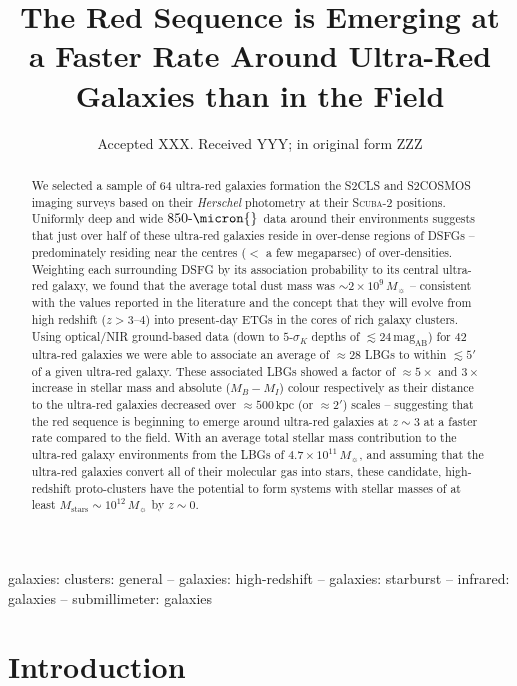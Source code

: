 \documentclass[a4paper, fleqn, usenatbib]{mnras}
\title[The Red Sequence is Emerging at a Faster Rate Around Ultra-Red Galaxies]{The Red Sequence is Emerging at a Faster Rate Around Ultra-Red Galaxies than in the Field}
\author[A.~J.~R.~Lewis et al.]{
A.~J.~R.~Lewis,
R.~J.~Ivison,$^{1,2}$
P.~N.~Best,$^{1}$
M.~Bremmer,${?}
J.~E.~Geach,$^{?}$
I.~Oteo,$^{?}$
J.~M.~Simpson,$^{?}$
A.~Weiss$^{?}$\\
$^{1}$Institute for Astronomy, University of Edinburgh, Royal Observatory, Blackford Hill, Edinburgh EH9 3HJ, UK\\
$^{2}$European Southern Observatory, Karl Schwarzchild Stra{\ss}e 2, D-85748 Garching, Germany
}
\date{Accepted XXX. Received YYY; in original form ZZZ}
\newcommand{\herschel}{\textit{Herschel}}
\newcommand{\magab}{\text{mag}_{\text{AB}}}
\newcommand{\msol}{M_{\sun}}
\newcommand{\mstars}{M_{\text{stars}}}
\newcommand{\scuba}{\mbox{\textsc{Scuba}-2}}
\newcommand{\urg}{ultra-red galaxy}
\begin{document}
\label{firstpage}
\pagerange{\pageref{firstpage}--\pageref{lastpage}}
\maketitle

\begin{abstract}
We selected a sample of $64$ ultra-red galaxies formation the S2CLS and S2COSMOS imaging surveys based on their \herschel{} photometry at their \scuba{} positions.
Uniformly deep and wide $850\text{-}\micron{}$ data around their environments suggests that just over half of these ultra-red galaxies reside in over-dense regions of DSFGs -- predominately residing near the centres ($<$ a few megaparsec) of over-densities.
Weighting each surrounding DSFG by its association probability to its central ultra-red galaxy, we found that the average total dust mass was $\sim2\times10^{9}\,\msol{}$ -- consistent with the values reported in the literature and the concept that they will evolve from high redshift ($z>3\text{--}4$) into present-day ETGs in the cores of rich galaxy clusters.
%
Using optical/NIR ground-based data (down to $5\text{-}\sigma_{K}$ depths of $\lesssim24\,\magab{}$) for $42$ ultra-red galaxies we were able to associate an average of $\approx28$ LBGs to within $\lesssim5'$ of a given \urg{}.
These associated LBGs showed a factor of $\approx5\times$ and $3\times$ increase in stellar mass and absolute ($M_{B}-M_{I}$) colour respectively as their distance to the ultra-red galaxies decreased over $\approx500\,\text{kpc}$ (or $\approx2'$) scales -- suggesting that the red sequence is beginning to emerge around ultra-red galaxies at $z\sim3$ at a faster rate compared to the field.
%
With an average total stellar mass contribution to the ultra-red galaxy environments from the LBGs of $4.7\times10^{11}\,\msol{}$, and assuming that the ultra-red galaxies convert all of their molecular gas into stars, these candidate, high-redshift proto-clusters have the potential to form systems with stellar masses of at least $\mstars{}\sim10^{12}\,\msol{}$ by $z\sim0$.
\end{abstract}

\begin{keywords}
galaxies: clusters: general -- galaxies: high-redshift -- galaxies: starburst -- infrared: galaxies -- submillimeter: galaxies
\end{keywords}

\section{Introduction}
\end{document}
